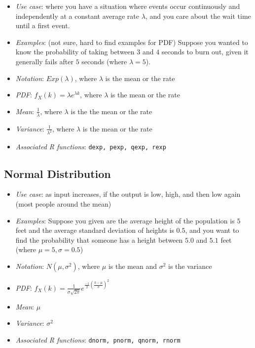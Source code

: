 \documentclass[12pt]{article}
\begin{document}
\begin{itemize}
	\item \textit{Use case}: where you have a situation where events occur
	      continuously and independently at a constant average rate $\lambda$,
	      and you care about the wait time until a first event.
	\item \textit{Examples}: (not sure, hard to find examples for PDF) Suppose
	      you wanted to know the probability of taking between $3$ and $4$
	      seconds to burn out, given it generally fails after $5$ seconds
	      (where $\lambda = 5$).
	\item \textit{Notation}: $Exp(\lambda)$, where $\lambda$ is the mean or the rate
	\item \textit{PDF}: $f_X(k) = \lambda e^{\lambda k}$, where $\lambda$ is the mean or the rate
	\item \textit{Mean}: $\frac{1}{\lambda}$, where $\lambda$ is the the mean or the rate
	\item \textit{Variance}: $\frac{1}{\lambda^2}$, where $\lambda$ is the mean or the rate
	\item \textit{Associated R functions}: \verb|dexp, pexp, qexp, rexp|
\end{itemize}


\subsection{Normal Distribution}

\begin{itemize}
	\item \textit{Use case}: as input increases, if the output is low, high,
	      and then low again (most people around the mean)
	\item \textit{Examples}: Suppose you given are the average height of the population is $5$ feet and
	      the average standard deviation of heights is $0.5$, and you
	      want to find the probability that someone has a height between $5.0$
	      and $5.1$ feet (where $\mu = 5, \sigma = 0.5$)
	\item \textit{Notation}: $N(\mu, \sigma^2)$, where $\mu$ is the mean and
	      $\sigma^2$ is the variance
	\item \textit{PDF}: $f_X(k) = \frac{1}{\sigma \sqrt{2\pi}}  e^{\frac{-1}{2}(\frac{k-\mu}{\sigma})^2}$
	\item \textit{Mean}: $\mu$
	\item \textit{Variance}: $\sigma^2$
	\item \textit{Associated R functions}: \verb|dnorm, pnorm, qnorm, rnorm|
\end{itemize}
\end{document}
